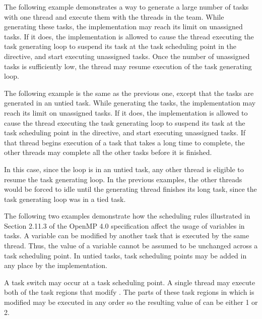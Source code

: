 The following example demonstrates a way to generate a large number of tasks with 
one thread and execute them with the threads in the team. While generating these 
tasks, the implementation may reach its limit on unassigned tasks.  If it does, 
the implementation is allowed to cause the thread executing the task generating 
loop to suspend its task at the task scheduling point in the  directive, 
and start executing unassigned tasks.  Once the number of unassigned tasks is sufficiently 
low, the thread may resume execution of the task generating loop.



The following example is the same as the previous one, except that the tasks are 
generated in an untied task. While generating the tasks, the implementation may 
reach its limit on unassigned tasks. If it does, the implementation is allowed 
to cause the thread executing the task generating loop to suspend its task at the 
task scheduling point in the  directive, and start executing unassigned 
tasks.  If that thread begins execution of a task that takes a long time to complete, 
the other threads may complete all the other tasks before it is finished.

In this case, since the loop is in an untied task, any other thread is eligible 
to resume the task generating loop. In the previous examples, the other threads 
would be forced to idle until the generating thread finishes its long task, since 
the task generating loop was in a tied task.



The following two examples demonstrate how the scheduling rules illustrated in 
Section 2.11.3 of the OpenMP 4.0 specification affect the usage of 
 variables in tasks. A  
variable can be modified by another task that is executed by the same thread. Thus, 
the value of a  variable cannot be assumed to be unchanged 
across a task scheduling point. In untied tasks, task scheduling points may be 
added in any place by the implementation.

A task switch may occur at a task scheduling point. A single thread may execute 
both of the task regions that modify . The parts of these task regions 
in which  is modified may be executed in any order so the resulting 
value of  can be either 1 or 2.

